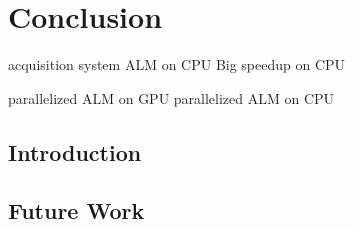 \chapter{Conclusion}
\label{chap:conclusion}

acquisition system
ALM on CPU
Big speedup on CPU

parallelized ALM on GPU
parallelized ALM on CPU



\section{Introduction}

\section{Future Work}




